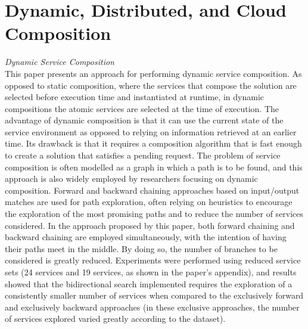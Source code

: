 \section{Dynamic, Distributed, and Cloud Composition}
\textit{Dynamic Service Composition \cite{khakhkhar2012dynamic}}\\
This paper presents an approach for performing dynamic service composition. As opposed to static composition, where the services that compose the solution
are selected before execution time and instantiated at runtime, in dynamic compositions the atomic services are selected at the time of execution. The advantage
of dynamic composition is that it can use the current state of the service environment as opposed to relying on information retrieved at an earlier time.
Its drawback is that it requires a composition algorithm that is fast enough to create a solution that satisfies a pending request. The problem of
service composition is often modelled as a graph in which a path is to be found, and this approach is also widely employed by researchers focusing
on dynamic composition. Forward and backward chaining approaches based on input/output matches are used for path exploration, often relying on heuristics
to encourage the exploration of the most promising paths and to reduce the number of services considered. In the approach proposed by this paper, both
forward chaining and backward chaining are employed simultaneously, with the intention of having their paths meet in the middle. By doing so, the number of
branches to be considered is greatly reduced. Experiments were performed using reduced service sets (24 services and 19 services, as shown in the paper's
appendix), and results showed that the bidirectional search implemented requires the exploration of a consistently smaller number of services when compared
to the exclusively forward and exclusively backward approaches (in these exclusive approaches, the number of services explored varied greatly according
to the dataset).

